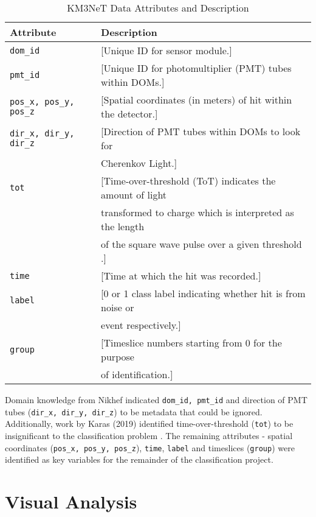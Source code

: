 \begin{table} [ht!]
    \begin{tabular}{l l}
    \hline
        \textbf{Attribute} & \textbf{Description} \\
    \hline
       \texttt{dom\_id} & [Unique ID for sensor module.] \\
       \texttt{pmt\_id} & [Unique ID for photomultiplier (PMT) tubes within DOMs.] \\
       \texttt{pos\_x, pos\_y, pos\_z}  & [Spatial coordinates (in meters) of hit within the detector.] \\
       \texttt{dir\_x, dir\_y, dir\_z} & [Direction of PMT tubes within DOMs to look for \\
                                       & Cherenkov Light.] \\
       \texttt{tot}   & [Time-over-threshold (ToT) indicates the amount of light \\
                      & transformed to charge which is interpreted as the length \\
                      & of the square wave pulse over a given threshold \cite{karas_2019}.] \\
       \texttt{time}  & [Time at which the hit was recorded.]\\
       \texttt{label} & [0 or 1 class label indicating whether hit is from noise or \\
                      & event respectively.]\\
       \texttt{group} & [Timeslice numbers starting from 0 for the purpose \\
                      & of identification.] \\
    \hline
    \end{tabular}
    \caption{KM3NeT Data Attributes and Description}
    \label{tab:attributes}
\end{table}


Domain knowledge from Nikhef indicated \texttt{dom\_id, pmt\_id} and direction of PMT tubes (\texttt{dir\_x, dir\_y, dir\_z}) to be metadata that could be ignored. Additionally, work by Karas (2019) identified time-over-threshold (\texttt{tot}) to be insignificant to the classification problem \cite{karas_2019}. The remaining attributes - spatial coordinates (\texttt{pos\_x, pos\_y, pos\_z}), \texttt{time}, \texttt{label} and timeslices (\texttt{group}) were identified as key variables for the remainder of the classification project. 


\section{Visual Analysis}

